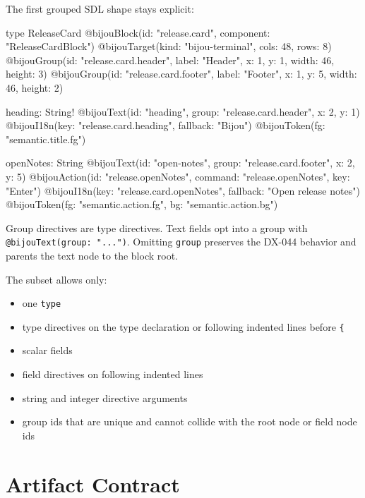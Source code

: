 The first grouped SDL shape stays explicit:

\begin{CodeBlock}
type ReleaseCard
  @bijouBlock(id: "release.card", component: "ReleaseCardBlock")
  @bijouTarget(kind: "bijou-terminal", cols: 48, rows: 8)
  @bijouGroup(id: "release.card.header", label: "Header", x: 1, y: 1, width: 46, height: 3)
  @bijouGroup(id: "release.card.footer", label: "Footer", x: 1, y: 5, width: 46, height: 2) {
  heading: String!
    @bijouText(id: "heading", group: "release.card.header", x: 2, y: 1)
    @bijouI18n(key: "release.card.heading", fallback: "Bijou")
    @bijouToken(fg: "semantic.title.fg")

  openNotes: String
    @bijouText(id: "open-notes", group: "release.card.footer", x: 2, y: 5)
    @bijouAction(id: "release.openNotes", command: "release.openNotes", key: "Enter")
    @bijouI18n(key: "release.card.openNotes", fallback: "Open release notes")
    @bijouToken(fg: "semantic.action.fg", bg: "semantic.action.bg")
}
\end{CodeBlock}

Group directives are type directives. Text fields opt into a group with \texttt{@\allowbreak{}b\allowbreak{}i\allowbreak{}j\allowbreak{}o\allowbreak{}u\allowbreak{}T\allowbreak{}e\allowbreak{}x\allowbreak{}t\allowbreak{}(\allowbreak{}g\allowbreak{}r\allowbreak{}o\allowbreak{}u\allowbreak{}p\allowbreak{}:\allowbreak{} \allowbreak{}"\allowbreak{}.\allowbreak{}.\allowbreak{}.\allowbreak{}"\allowbreak{})}. Omitting \texttt{g\allowbreak{}r\allowbreak{}o\allowbreak{}u\allowbreak{}p} preserves the DX-044 behavior and parents the text node to the block root.

The subset allows only:

\begin{itemize}
\tightlist
\item
  one \texttt{t\allowbreak{}y\allowbreak{}p\allowbreak{}e}
\item
  type directives on the type declaration or following indented lines before \texttt{\{}
\item
  scalar fields
\item
  field directives on following indented lines
\item
  string and integer directive arguments
\item
  group ids that are unique and cannot collide with the root node or field node ids
\end{itemize}

\section{Artifact Contract}\label{record-141-artifact-contract}

